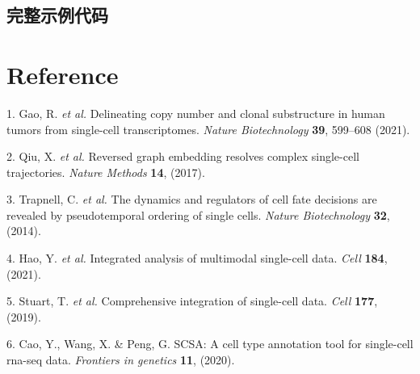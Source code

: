 \documentclass[
]{article}
\newenvironment{cslreferences}%
  {}%
  {\par}
\begin{document}
\hypertarget{ux5b8cux6574ux793aux4f8bux4ee3ux7801}{%
\subsection{完整示例代码}\label{ux5b8cux6574ux793aux4f8bux4ee3ux7801}}

\hypertarget{bibliography}{%
\section*{Reference}\label{bibliography}}

\hypertarget{refs}{}
\begin{cslreferences}
\leavevmode\hypertarget{ref-DelineatingCopGaoR2021}{}%
1. Gao, R. \emph{et al.} Delineating copy number and clonal substructure in human tumors from single-cell transcriptomes. \emph{Nature Biotechnology} \textbf{39}, 599--608 (2021).

\leavevmode\hypertarget{ref-ReversedGraphQiuX2017}{}%
2. Qiu, X. \emph{et al.} Reversed graph embedding resolves complex single-cell trajectories. \emph{Nature Methods} \textbf{14}, (2017).

\leavevmode\hypertarget{ref-TheDynamicsAnTrapne2014}{}%
3. Trapnell, C. \emph{et al.} The dynamics and regulators of cell fate decisions are revealed by pseudotemporal ordering of single cells. \emph{Nature Biotechnology} \textbf{32}, (2014).

\leavevmode\hypertarget{ref-IntegratedAnalHaoY2021}{}%
4. Hao, Y. \emph{et al.} Integrated analysis of multimodal single-cell data. \emph{Cell} \textbf{184}, (2021).

\leavevmode\hypertarget{ref-ComprehensiveIStuart2019}{}%
5. Stuart, T. \emph{et al.} Comprehensive integration of single-cell data. \emph{Cell} \textbf{177}, (2019).

\leavevmode\hypertarget{ref-ScsaACellTyCaoY2020}{}%
6. Cao, Y., Wang, X. \& Peng, G. SCSA: A cell type annotation tool for single-cell rna-seq data. \emph{Frontiers in genetics} \textbf{11}, (2020).
\end{cslreferences}
\end{document}
